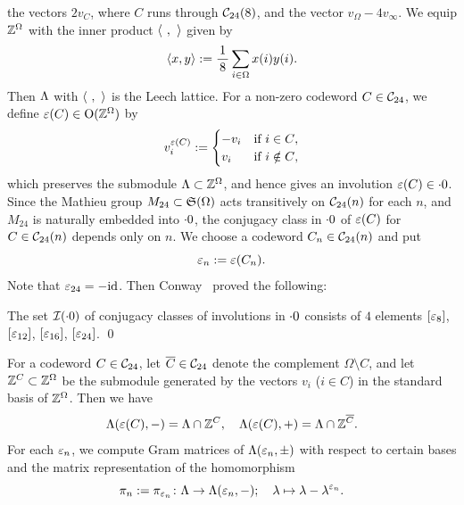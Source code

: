\documentclass{amsart} %
\begin{document}
the vectors $2v_C$,
where $C$ runs through $\mathord{\mathcal{C}}_{24}(8)$, and 
the vector $v_{\Omega}-4v_{\infty}$.
%
%
We equip $\mathord{\mathbb{Z}}^{\Omega}$ with the inner product $\langle \phantom{i}, \phantom{i} \rangle$ 
given by
\[
\langle x, y \rangle:=\frac{1}{\,8\,} \sum_{i\in\Omega} x(i) y(i).
\]
Then $\Lambda$ with $\langle \phantom{i}, \phantom{i} \rangle$ is the Leech lattice.
For a non-zero codeword $C\in \mathord{\mathcal{C}}_{24}$,
we define $\varepsilon(C)\in \mathord{\mathrm{O}}(\mathord{\mathbb{Z}}^{\Omega})$ by 
\[
v_i^{\varepsilon(C)}:=
\begin{cases}
-v_i & \textrm{if $i\in C$}, \\
v_i& \textrm{if $i\notin C$},
\end{cases}
\]
which preserves the submodule $\Lambda\subset \mathord{\mathbb{Z}}^{\Omega}$, and hence gives 
an involution $\varepsilon(C)\in \cdot 0$. %
Since the Mathieu group $M_{24}\subset \mathord{\mathfrak{S}}(\Omega)$ acts transitively
on $\mathord{\mathcal{C}}_{24}(n)$ for each $n$, 
and $M_{24}$ is naturally embedded into $\cdot 0$,
the conjugacy class in $\cdot 0$ of $\varepsilon(C)$ for $C\in \mathord{\mathcal{C}}_{24}(n)$ 
depends only on $n$.
We choose a codeword $C_n\in \mathord{\mathcal{C}}_{24}(n)$ and put
\[
\varepsilon_n:=\varepsilon(C_n).
\]
Note that $\varepsilon_{24}=-\mathord{\mathrm{id}}$.
Then Conway~\cite[Chapter 10, Section 3.7]{theCSbook} proved the following:
%
\begin{theorem}[Conway]
The set $\mathord{\mathcal{I}}(\cdot 0)$ of conjugacy classes of involutions in $\cdot 0$ 
consists of $4$ elements $[\varepsilon_8]$, $[\varepsilon_{12}]$, $[\varepsilon_{16}]$, $[\varepsilon_{24}]$.
\qed
\end{theorem}
%
%
%
For a codeword $C\in \mathord{\mathcal{C}}_{24}$,
let $\overline{C}\in \mathord{\mathcal{C}}_{24}$ denote the complement $\Omega\setminus C$,
and let 
$\mathord{\mathbb{Z}}^{C}\subset \mathord{\mathbb{Z}}^{\Omega}$ be 
the submodule generated by the vectors $v_i$ ($i\in C$)
in the standard basis of $\mathord{\mathbb{Z}}^{\Omega}$.
Then we have
%
\begin{equation}\label{eq:Leechveppm}
\Lambda(\varepsilon(C), -)=\Lambda\cap \mathord{\mathbb{Z}}^{C},
\quad
\Lambda(\varepsilon(C), +)=\Lambda\cap \mathord{\mathbb{Z}}^{\overline{C}}.
\end{equation}
%
For each $\varepsilon_n$,
we compute Gram matrices of $\Lambda(\varepsilon_n, \pm)$ 
with respect to certain bases
and the matrix representation of the homomorphism 
\[
\pi_n:=\pi_{\varepsilon_n}\colon \Lambda \to \Lambda(\varepsilon_n, -); \quad \lambda\mapsto \lambda-\lambda^{\varepsilon_n}.
\]
\end{document}

